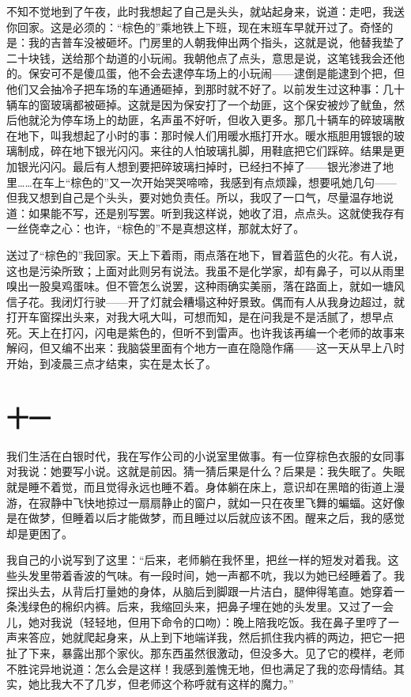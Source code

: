 不知不觉地到了午夜，此时我想起了自己是头头，就站起身来，说道：走吧，我送你回家。这是必须的：“棕色的”乘地铁上下班，现在末班车早就开过了。奇怪的是：我的吉普车没被砸坏。门房里的人朝我伸出两个指头，这就是说，他替我垫了二十块钱，送给那个劫道的小玩闹。我朝他点了点头，意思是说，这笔钱我会还他的。保安可不是傻瓜蛋，他不会去逮停车场上的小玩闹——逮倒是能逮到个把，但他们又会抽冷子把车场的车通通砸掉，到那时就不好了。以前发生过这种事：几十辆车的窗玻璃都被砸掉。这就是因为保安打了一个劫匪，这个保安被炒了鱿鱼，然后他就沦为停车场上的劫匪，名声虽不好听，但收入更多。那几十辆车的碎玻璃散在地下，叫我想起了小时的事：那时候人们用暖水瓶打开水。暖水瓶胆用镀银的玻璃制成，碎在地下银光闪闪。来往的人怕玻璃扎脚，用鞋底把它们踩碎。结果是更加银光闪闪。最后有人想到要把碎玻璃扫掉时，已经扫不掉了——银光渗进了地里……在车上“棕色的”又一次开始哭哭啼啼，我感到有点烦躁，想要吼她几句——但我又想到自己是个头头，要对她负责任。所以，我叹了一口气，尽量温存地说道：如果能不写，还是别写罢。听到我这样说，她收了泪，点点头。这就使我存有一丝侥幸之心：也许，“棕色的”不是真想这样，那就太好了。 

送过了“棕色的”我回家。天上下着雨，雨点落在地下，冒着蓝色的火花。有人说，这也是污染所致；上面对此则另有说法。我虽不是化学家，却有鼻子，可以从雨里嗅出一股臭鸡蛋味。但不管怎么说罢，这种雨确实美丽，落在路面上，就如一塘风信子花。我闭灯行驶——开了灯就会糟塌这种好景致。偶而有人从我身边超过，就打开车窗探出头来，对我大吼大叫，可想而知，是在问我是不是活腻了，想早点死。天上在打闪，闪电是紫色的，但听不到雷声。也许我该再编一个老师的故事来解闷，但又编不出来：我脑袋里面有个地方一直在隐隐作痛——这一天从早上八时开始，到凌晨三点才结束，实在是太长了。 
\section*{十一} 

我们生活在白银时代，我在写作公司的小说室里做事。有一位穿棕色衣服的女同事对我说：她要写小说。这就是前因。猜一猜后果是什么？后果是：我失眠了。失眠就是睡不着觉，而且觉得永远也睡不着。身体躺在床上，意识却在黑暗的街道上漫游，在寂静中飞快地掠过一扇扇静止的窗户，就如一只在夜里飞舞的蝙蝠。这好像是在做梦，但睡着以后才能做梦，而且睡过以后就应该不困。醒来之后，我的感觉却是更困了。 

我自己的小说写到了这里：“后来，老师躺在我怀里，把丝一样的短发对着我。这些头发里带着香波的气味。有一段时间，她一声都不吭，我以为她已经睡着了。我探出头去，从背后打量她的身体，从脑后到脚跟一片洁白，腿伸得笔直。她穿着一条浅绿色的棉织内裤。后来，我缩回头来，把鼻子埋在她的头发里。又过了一会儿，她对我说（轻轻地，但用下命令的口吻）：晚上陪我吃饭。我在鼻子里哼了一声来答应，她就爬起身来，从上到下地端详我，然后抓住我内裤的两边，把它一把扯了下来，暴露出那个家伙。那东西虽然很激动，但没多大。见了它的模样，老师不胜诧异地说道：怎么会是这样！我感到羞愧无地，但也满足了我的恋母情结。其实，她比我大不了几岁，但老师这个称呼就有这样的魔力。” 


